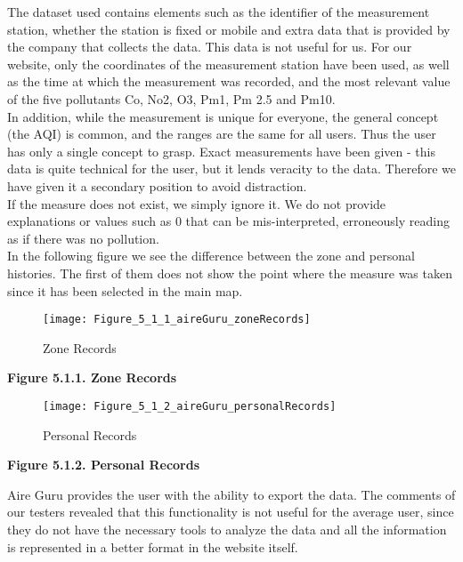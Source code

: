 The dataset used contains elements such as the identifier of the measurement station, whether the station is fixed or mobile
and extra data that is provided by the company that collects the data. This data is not useful for us.
For our website, only the coordinates of the measurement station have been used, as well as the time at which the measurement was recorded,
and the most relevant value of the five pollutants Co, No2, O3, Pm1, Pm 2.5 and Pm10.\\

In addition, while the measurement is unique for everyone, the general concept (the AQI) is common, and the ranges are the same for all users.
Thus the user has only a single concept to grasp. Exact measurements have been given - this data is quite technical for the user, but 
it lends veracity to the data. Therefore we have given it a secondary position to avoid distraction.\\

If the measure does not exist, we simply ignore it. We do not provide explanations or values such as 0 that can be mis-interpreted, erroneously reading as if there was no pollution.\\

In the following figure we see the difference between the zone and personal histories. The first of them does not show
the point where the measure was taken since it has been selected in the main map.\\


\begin{figure}[ht]
    \centering
    \texttt{[image: Figure\_5\_1\_1\_aireGuru\_zoneRecords]}
    \caption{ Zone Records}
\end{figure}
\begin{center}
    \bf{ 
    Figure 5.1.1. Zone Records}
\end{center}

\begin{figure}[ht]
    \centering
    \texttt{[image: Figure\_5\_1\_2\_aireGuru\_personalRecords]}
    \caption{ Personal Records}
\end{figure}
\begin{center}
    \bf{ 
    Figure 5.1.2. Personal Records}
\end{center}

Aire Guru provides the user with the ability to export the data. The comments of our testers revealed
that this functionality is not useful for the average user, since they do not have the necessary tools to
analyze the data and all the information is represented in a better format in the website itself.